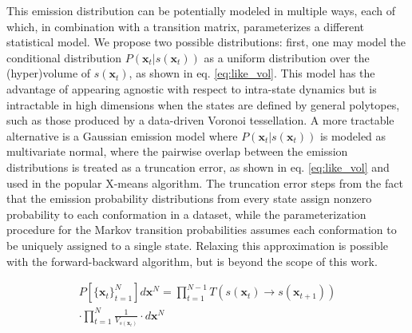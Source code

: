\documentclass[twocolumn,floatfix,nofootinbib,aps]{revtex4-1}
\begin{document}
This emission distribution can be potentially modeled in multiple ways, each of which, in combination with a transition matrix, parameterizes a different statistical model. We propose two possible distributions: first, one may model the conditional distribution $P(\mathbf{x}_t | s(\mathbf{x}_t))$ as a uniform distribution over the (hyper)volume of $s(\mathbf{x}_t)$, as shown in eq. \ref{eq:like_vol}. This model has the advantage of appearing agnostic with respect to intra-state dynamics but is intractable in high dimensions when the states are defined by general polytopes, such as those produced by a data-driven Voronoi tessellation. A more tractable alternative is a Gaussian emission model where $P(\mathbf{x}_t | s(\mathbf{x}_t))$ is modeled as multivariate normal, where the pairwise overlap between the emission distributions is treated as a truncation error, as shown in eq.  \ref{eq:like_vol} and used in the popular X-means algorithm.\cite{Pelleg2000Xmeans} The truncation error steps from the fact that the emission probability distributions from every state assign nonzero probability to each conformation in a dataset, while the parameterization procedure for the Markov transition probabilities assumes each conformation to be uniquely assigned to a single state. Relaxing this approximation is possible with the forward-backward algorithm,\cite{Rabiner1989Tutorial} but is beyond the scope of this work.


\begin{equation}
\label{eq:like_vol}
\begin{split}
P\left[\{\mathbf{x}_t\}_{t=1}^N\right] d\mathbf{x}^N = \prod_{t=1}^{N-1} T(s(\mathbf{x}_t) \rightarrow s(\mathbf{x}_{t+1})) \\
	\cdot \prod_{t=1}^N \frac{1}{V_{s(\mathbf{x}_{t})}} \cdot d\mathbf{x}^N
\end{split}
\end{equation}
\end{document}
